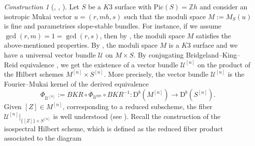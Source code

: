 \documentclass[12pt,a4paper]{amsart}
\theoremstyle{plain}
\theoremstyle{definition}
\theoremstyle{remark}
\newtheorem{construction}[thm]{Construction}
\def\Pic{\mathrm{Pic}}
\def\U{\mathcal{U}}
\newcommand{\D}{\mathrm{D}^b}
\newcommand{\ZZ}{\mathbb{Z}}
\begin{document}
\begin{construction}[{{\cite[Section 4]{ogrady-moduli-sheaves-hk}, \cite[Section 11]{markmanstable}, \cite[Section 7]{markman}}}]\label{example1}
    Let $S$ be a $K3$ surface with $\Pic(S)=\ZZ h$ and consider an isotropic Mukai vector $u=(r, mh, s)$ such that the moduli space $M:=M_S(u)$ is fine and parametrises slope-stable bundles. 
    For instance, if we assume $\gcd(r,m)=1=\gcd(r,s)$, then by \cite[Corollary 4.6.7, Remark 6.1.9]{HL10}, the moduli space $M$ satisfies the above-mentioned properties.  By \cite{Mukai2}, the moduli space $M$ is a $K3$ surface and we have a universal vector bundle $\mathcal{U}$ on $M\times S$. 
    By conjugating Bridgeland--King--Reid equivalence \cite{bridgeland-king-reid-mckay}, we get the existence of a vector bundle $\mathcal{U}^{[n]}$ on the product of the Hilbert schemes $M^{[n]}\times S^{[n]}$.
    More precisely, the vector bundle $\mathcal{U}^{[n]}$ is the Fourier--Mukai kernel of the derived equivalence
    \[
\Phi_{\U^{[n]}}:=BKR\circ\Phi_{\U^{\boxtimes n}}\circ BKR^{-1}\colon \D(M^{[n]})\to \D(S^{[n]}).
    \]
    Given $[Z]\in M^{[n]}$, corresponding to a reduced subscheme, the fiber ${\mathcal{U}^{[n]}}|_{\{[Z]\}\times S^{[n]}}$ is well understood (see \cite[Section 4.3]{ogrady-moduli-sheaves-hk}). Recall the construction of the isospectral Hilbert scheme, which is defined as the reduced fiber product associated to the diagram
    

\end{construction}
\end{document}
